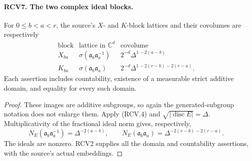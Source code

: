 \paragraph{RCV7. The two complex ideal blocks.}
\label{claim:RCV7}
For \(0\leq b<a<r\), the source's \(X\)- and \(K\)-block
lattices and their covolumes are respectively
\[
\begin{array}{c|c|c}
 \text{block}&\text{lattice in }\mathbb C^d&\text{covolume}\\ \hline
 X_{ba}&\sigma(\mathfrak a_b\mathfrak a_a^{-1})
                 &2^{-d}\Delta^{1-2(a-b)}\\
 K_{ba}&\sigma(\mathfrak a_b\mathfrak a_a)
                 &2^{-d}\Delta^{1-2(r-b)-2(r-a)}.
\end{array}
\tag{RCV.11}
\]
Each assertion includes countability, existence of a measurable
strict additive domain, and equality for every such domain.
\begin{proof}
These images are additive subgroups, so again the generated-subgroup
notation does not enlarge them.  Apply (RCV.4) and
\(\sqrt{|\operatorname{disc}E|}=\Delta\).  Multiplicativity of
the fractional ideal norm gives, respectively,
\[
 N_E(\mathfrak a_b\mathfrak a_a^{-1})=\Delta^{-2(a-b)},
 \qquad
 N_E(\mathfrak a_b\mathfrak a_a)
       =\Delta^{-2(r-b)-2(r-a)}.
\]
The ideals are nonzero.  RCV2 supplies all the domain and
countability assertions, with the source's actual embeddings.
\end{proof}

